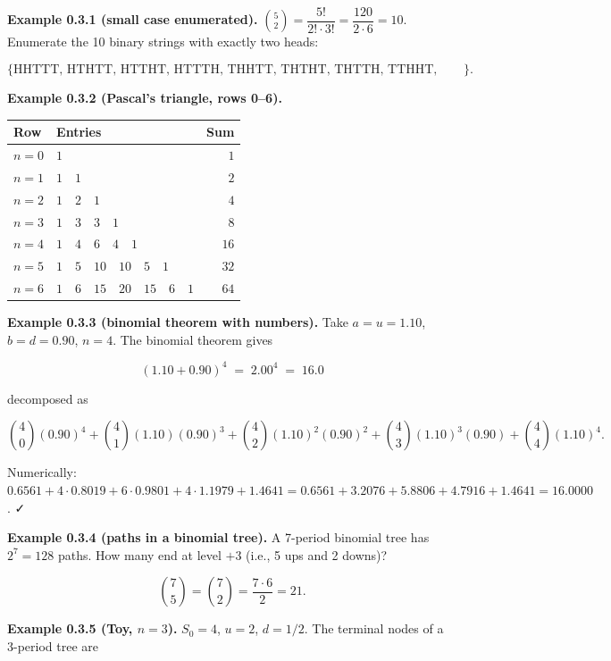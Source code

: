 \documentclass[
  10pt,
  twoside]{book}
\newcounter{none} %
\begin{document}
\textbf{Example 0.3.1 (small case enumerated).}
\(\binom{5}{2} = \dfrac{5!}{2! \cdot 3!} = \dfrac{120}{2 \cdot 6} = 10\).
Enumerate the 10 binary strings with exactly two heads:

\[\{\text{HHTTT, HTHTT, HTTHT, HTTTH, THHTT, THTHT, THTTH, TTHHT, TTHTH, TTTHH}\}.\]

\textbf{Example 0.3.2 (Pascal's triangle, rows 0--6).}

{\def\LTcaptype{none} %
\begin{table}[H]
\centering
\begin{tabular}{|l|l|r|}
\toprule
Row & Entries & Sum \\
\midrule



\(n=0\) & \(1\) & \(1\) \\
\(n=1\) & \(1\quad 1\) & \(2\) \\
\(n=2\) & \(1\quad 2\quad 1\) & \(4\) \\
\(n=3\) & \(1\quad 3\quad 3\quad 1\) & \(8\) \\
\(n=4\) & \(1\quad 4\quad 6\quad 4\quad 1\) & \(16\) \\
\(n=5\) & \(1\quad 5\quad 10\quad 10\quad 5\quad 1\) & \(32\) \\
\(n=6\) & \(1\quad 6\quad 15\quad 20\quad 15\quad 6\quad 1\) & \(64\) \\
\bottomrule
\end{tabular}
\end{table}
}

\textbf{Example 0.3.3 (binomial theorem with numbers).} Take
\(a = u = 1.10\), \(b = d = 0.90\), \(n = 4\). The binomial theorem
gives

\[(1.10 + 0.90)^4 \;=\; 2.00^4 \;=\; 16.0\]

decomposed as

\[\binom{4}{0}(0.90)^4 + \binom{4}{1}(1.10)(0.90)^3 + \binom{4}{2}(1.10)^2(0.90)^2 + \binom{4}{3}(1.10)^3(0.90) + \binom{4}{4}(1.10)^4.\]

Numerically:
\(0.6561 + 4 \cdot 0.8019 + 6 \cdot 0.9801 + 4 \cdot 1.1979 + 1.4641 = 0.6561 + 3.2076 + 5.8806 + 4.7916 + 1.4641 = 16.0000\).
✓

\textbf{Example 0.3.4 (paths in a binomial tree).} A 7-period binomial
tree has \(2^7 = 128\) paths. How many end at level \(+3\) (i.e., 5 ups
and 2 downs)?

\[\binom{7}{5} = \binom{7}{2} = \frac{7 \cdot 6}{2} = 21.\]

\textbf{Example 0.3.5 (Toy, \(n = 3\)).} \(S_0 = 4\), \(u = 2\),
\(d = 1/2\). The terminal nodes of a 3-period tree are
\end{document}
